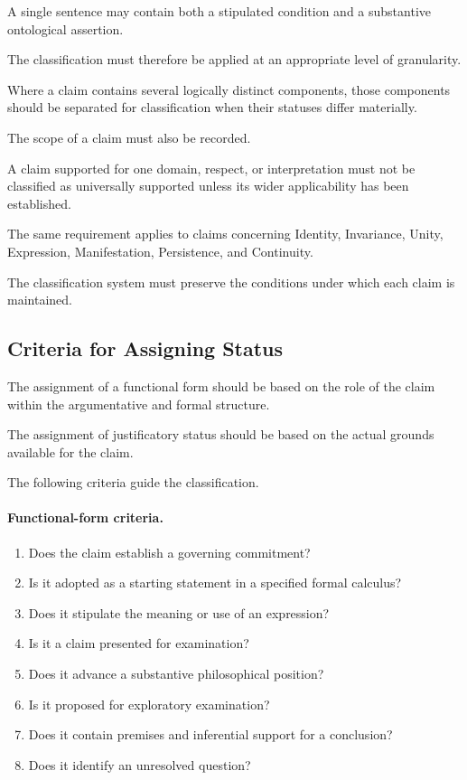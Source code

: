 A single
sentence may
contain both
a stipulated
condition and
a substantive
ontological assertion.

The classification
must therefore
be applied
at an appropriate
level of
granularity.

Where a
claim contains
several logically
distinct components,
those components
should be
separated for
classification
when their
statuses differ
materially.

The scope
of a claim
must also
be recorded.

A claim
supported for
one domain,
respect, or
interpretation
must not
be classified
as universally
supported unless
its wider
applicability
has been
established.

The same
requirement
applies to
claims concerning
Identity, Invariance,
Unity, Expression,
Manifestation,
Persistence, and
Continuity.

The classification
system must
preserve the
conditions under
which each
claim is
maintained.

\subsection{Criteria for Assigning Status}

The assignment
of a functional
form should
be based
on the
role of
the claim
within the
argumentative
and formal
structure.

The assignment
of justificatory
status should
be based
on the
actual grounds
available for
the claim.

The following
criteria guide
the classification.

\paragraph{Functional-form criteria.}

\begin{enumerate}
    \item Does the claim
    establish a governing
    commitment?
    \item Is it adopted
    as a starting
    statement in
    a specified
    formal calculus?
    \item Does it
    stipulate the
    meaning or
    use of
    an expression?
    \item Is it
    a claim
    presented for
    examination?
    \item Does it
    advance a
    substantive
    philosophical
    position?
    \item Is it
    proposed for
    exploratory
    examination?
    \item Does it
    contain premises
    and inferential
    support for
    a conclusion?
    \item Does it
    identify an
    unresolved
    question?
\end{enumerate}


